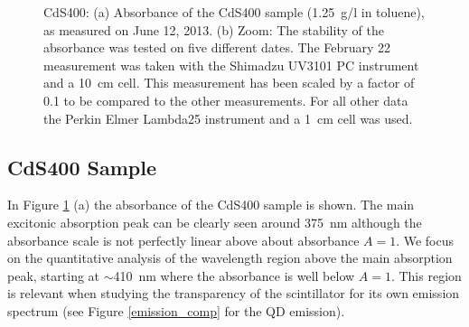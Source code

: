 \documentclass[cits]{JINST}
\begin{document}
\begin{figure}[tb]
\begin{center}
\caption[]{CdS400: (a) Absorbance of the CdS400 sample (1.25~g/l in toluene), as measured on June 12, 2013. (b) Zoom: The stability of the absorbance was tested on five different dates. The February 22 measurement was taken with the Shimadzu UV3101 PC instrument and a 10~cm cell. This measurement has been scaled by a factor of 0.1 to be compared to the other measurements. For all other data the Perkin Elmer Lambda25 instrument and a 1~cm cell was used. \label{cds400_stability}}
\end{center}
\end{figure}

\subsection{CdS400 Sample}
In Figure \ref{cds400_stability} (a) the absorbance of the CdS400 sample is shown. The main excitonic absorption peak can be clearly seen around 375~nm although the absorbance scale is not perfectly linear above about absorbance $A=1$. We focus on the quantitative analysis of the wavelength region above the main absorption peak, starting at $\sim$410~nm where the absorbance is well below $A=1$. This region is relevant when studying the transparency of the scintillator for its own emission spectrum (see Figure \ref{emission_comp} for the QD emission). 
\end{document}

